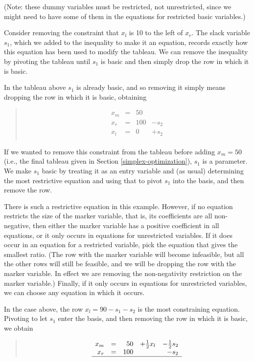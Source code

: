 \documentclass{article}
\begin{document}
(Note: these dummy variables must be restricted, not unrestricted, since we
might need to have some of them in the equations for restricted basic
variables.)

Consider removing the constraint that $x_l$ is 10 to the left of $x_r$.
The slack variable $s_1$, which we added to the inequality to make it
an equation, records exactly how this equation has been used to modify the
tableau.  We can remove the inequality by pivoting the tableau until 
$s_1$ is basic and then simply drop the row in which it is basic.

In the tableau above $s_1$ is already basic, and so removing it simply means
dropping the row in which it is basic, obtaining
\begin{quote}\vspace*{-1ex}
$$
\begin{array}{rlrrr} 
x_m & = &50   \\
x_r & = &100 & - s_2 \\ \hline
x_l & = &0 & + s_2 \\

\end{array}
$$
\end{quote}\vspace{-0.9ex}

If we wanted to remove this constraint
from the tableau before adding $x_m = 50$ (i.e., the final tableau given in
Section \ref{simplex-optimization}), $s_1$ is a parameter.
We make $s_1$ basic by treating it as an entry variable and
(as usual) determining the most restrictive equation and using that 
to pivot $s_1$ into the basis, and then remove the row.

There is such a restrictive equation in this example.  However, if no
equation restricts the size of the marker variable, that is, its
coefficients are all non-negative, then either the marker variable has a
positive coefficient in all equations, or it only occurs in equations for
unrestricted variables.  If it does occur in an equation for a restricted
variable, pick the equation that gives the smallest ratio.  (The row with
the marker variable will become infeasible, but all the other rows will
still be feasible, and we will be dropping the row with the marker
variable.  In effect we are removing the non-negativity restriction on the
marker variable.)  Finally, if it only occurs in equations for unrestricted
variables, we can choose any equation in which it occurs.

In the case above, the row $x_l  = 90  - s_1  - s_2$
is the most constraining equation.
Pivoting to let $s_1$ enter the
basis, and then removing the row in which it is basic, we obtain
\begin{quote}\vspace*{-1ex}
$$
\begin{array}{rlrrr} 
x_m & = &50 & + \frac{1}{2} x_l & - \frac{1}{2} s_2 \\
x_r & = &100 &  & - s_2 \\ \hline
\end{array}
$$
\end{quote}\vspace{-0.9ex}
\end{document}
